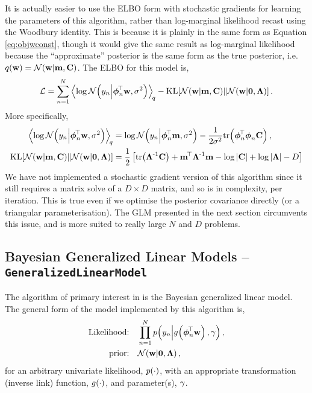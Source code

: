 \documentclass[11pt, oneside]{article}
\begin{document}
It is actually easier to use the ELBO form with stochastic gradients for
learning the parameters of this algorithm, rather than log-marginal likelihood
recast using the Woodbury identity.  This is because it is plainly in the same
form as Equation \eqref{eq:objwconst}, though it would give the same result as
log-marginal likelihood because the ``approximate'' posterior is the same form
as the true posterior, i.e.\ $q\!\left({\mathbf{w}}\right) = \mathcal{N}\!\left({\mathbf{w}}\middle\vert{\ensuremath{\mathbf{m}},
    \ensuremath{\mathbf{C}}}\right)$. The ELBO for this model is,
\begin{equation}
    \elbo = \sum^N_{n=1} 
    \expec{q}{\log\gausC{\targs_n}{\feats_n\T\weights, \var}}
    - \KL{\gausC{\weights}{\pomean, \pocov}}
        {\gausC{\weights}{\mathbf{0}, \Reg}}.
    \label{eq:slmobj}
\end{equation}
More specifically,
\begin{align*}
    \expec{q}{\log\gausC{\targs_n}{\feats_n\T\weights, \var}} &=
    \log \gausC{\targs_n}{\feats_n\T\pomean, \var}
    - \frac{1}{2 \var} \trace{\feats_n\T\feats_n\pocov}, \\
    \KL{\gausC{\weights}{\pomean, \pocov}}
        {\gausC{\weights}{\mathbf{0}, \Reg}} &=
        \frac{1}{2} \sbrac{\trace{\Reg\inv\pocov} + \pomean\T\Reg\inv\pomean 
        -  \log\deter{\pocov} + \log\deter{\Reg} - D}
\end{align*}
We have not implemented a stochastic gradient version of this algorithm since
it still requires a matrix solve of a $D \times D$ matrix, and so is 
in complexity, per iteration. This is true even if we optimise the posterior
covariance directly (or a triangular parameterisation). The GLM presented in
the next section circumvents this issue, and is more suited to really large $N$
and $D$ problems.


\subsection{Bayesian Generalized Linear Models --
    \texttt{GeneralizedLinearModel}}

The algorithm of primary interest in \revrand is the Bayesian generalized
linear model. The general form of the model implemented by this algorithm is,
\begin{align}
    \text{Likelihood:} \quad &\prod^N_{n=1} 
        p\!\left({y_n}\middle\vert{\ensuremath{{g}_{}\!\left({{\boldsymbol\phi_n^{\!\top}\mathbf{w}}}\right)}, \ensuremath{\gamma}}\right), 
        \label{eq:glmlike} \\
    \text{prior:} \quad &\mathcal{N}\!\left({\mathbf{w}}\middle\vert{\mathbf{0}, \ensuremath{\boldsymbol{\Lambda}}}\right),
\end{align}
for an arbitrary univariate likelihood, $p\!\left({\cdot}\right)$, with an appropriate
transformation (inverse link) function, ${g}_{}\!\left({{\cdot}}\right)$, and parameter(s),
$\gamma$. 
\end{document}

